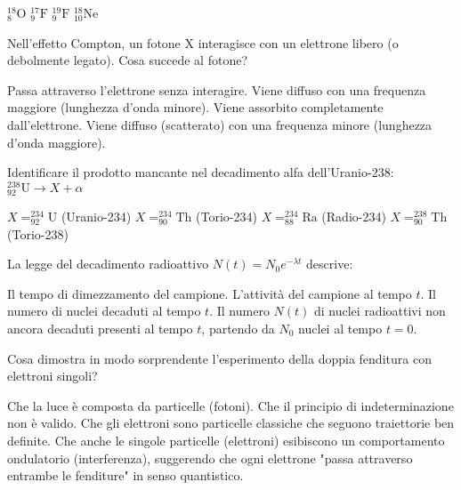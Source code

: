 \documentclass{exam}%
\begin{document}
\begin{questions}
\begin{multicols}{4}%
\begin{choices}%
\choice $^{18}_{8}\text{O}$%
\choice $^{17}_{9}\text{F}$%
\choice $^{19}_{9}\text{F}$%
\choice $^{18}_{10}\text{Ne}$%
\end{choices}%
\end{multicols}%
\question Nell'effetto Compton, un fotone X interagisce con un elettrone libero (o debolmente legato). Cosa succede al fotone?%
\vspace{0.2em}%
\begin{choices}%
\choice Passa attraverso l'elettrone senza interagire.%
\choice Viene diffuso con una frequenza maggiore (lunghezza d'onda minore).%
\choice Viene assorbito completamente dall'elettrone.%
\choice Viene diffuso (scatterato) con una frequenza minore (lunghezza d'onda maggiore).%
\end{choices}%
\question Identificare il prodotto mancante nel decadimento alfa dell'Uranio-238: $^{238}_{92}\text{U} \rightarrow X + \alpha$%
\vspace{0.2em}%
\begin{multicols}{4}%
\begin{choices}%
\choice $X = ^{234}_{92}\text{U}$ (Uranio-234)%
\choice $X = ^{234}_{90}\text{Th}$ (Torio-234)%
\choice $X = ^{234}_{88}\text{Ra}$ (Radio-234)%
\choice $X = ^{238}_{90}\text{Th}$ (Torio-238)%
\end{choices}%
\end{multicols}%
\question La legge del decadimento radioattivo $N(t) = N_0 e^{-\lambda t}$ descrive:%
\vspace{0.2em}%
\begin{choices}%
\choice Il tempo di dimezzamento del campione.%
\choice L'attività del campione al tempo $t$.%
\choice Il numero di nuclei decaduti al tempo $t$.%
\choice Il numero $N(t)$ di nuclei radioattivi non ancora decaduti presenti al tempo $t$, partendo da $N_0$ nuclei al tempo $t=0$.%
\end{choices}%
\question Cosa dimostra in modo sorprendente l'esperimento della doppia fenditura con elettroni singoli?%
\vspace{0.2em}%
\begin{choices}%
\choice Che la luce è composta da particelle (fotoni).%
\choice Che il principio di indeterminazione non è valido.%
\choice Che gli elettroni sono particelle classiche che seguono traiettorie ben definite.%
\choice Che anche le singole particelle (elettroni) esibiscono un comportamento ondulatorio (interferenza), suggerendo che ogni elettrone "passa attraverso entrambe le fenditure" in senso quantistico.%

\end{choices}
\end{questions}
\end{document}
